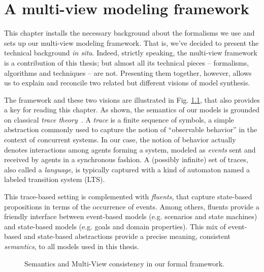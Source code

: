 \chapter{A multi-view modeling framework\label{chapter:framework}}

This chapter installs the necessary background about the formalisms we use and sets up our multi-view modeling framework. That is, we've decided to present the technical background \emph{in situ}. Indeed, strictly speaking, the multi-view framework is a contribution of this thesis; but almost all its technical pieces -- formalisms, algorithms and techniques -- are not. Presenting them together, however, allows us to explain and reconcile two related but different visions of model synthesis.

The framework and these two visions are illustrated in Fig. \ref{image:framework}, that also provides a key for reading this chapter. As shown, the semantics of our models is grounded on classical \emph{trace theory}~\cite{Hoare:1985}. A \emph{trace} is a finite sequence of symbols, a simple abstraction commonly used to capture the notion of ``observable behavior'' in the context of concurrent systems. In our case, the notion of behavior actually denotes interactions among agents forming a system, modeled as \emph{events} sent and received by agents in a synchronous fashion. A (possibly infinite) set of traces, also called a \emph{language}, is typically captured with a kind of automaton named a labeled transition system (LTS).

This trace-based setting is complemented with \emph{fluents}, that capture state-based propositions in terms of the occurrence of events. Among others, fluents provide a friendly interface between event-based models (e.g. scenarios and state machines) and state-based models (e.g. goals and domain properties). This mix of event-based and state-based abstractions provide a precise meaning, consistent \emph{semantics}, to all models used in this thesis. 

\begin{figure}[t]\centering
  \caption{Semantics and Multi-View consistency in our formal framework.\label{image:framework}}
\end{figure}

